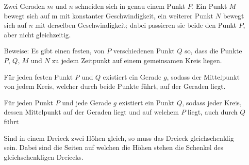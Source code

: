 \documentclass[10pt, a4paper]{amsart}
\begin{document}
\newpage
\begin{aufgabe}
  Zwei Geraden $m$ und $n$ schneiden sich in genau einem Punkt $P$. Ein Punkt
  $M$ bewegt sich auf m mit konstanter Geschwindigkeit, ein weiterer Punkt $N$
  bewegt sich auf $n$ mit derselben Geschwindigkeit; dabei passieren sie beide
  den Punkt $P$, aber nicht gleichzeitig.
 
  Beweise: Es gibt einen festen, von $P$ verschiedenen Punkt $Q$ so, dass die
  Punkte
  $P$, $Q$, $M$ und $N$ zu jedem Zeitpunkt auf einem gemeinsamen Kreis liegen.\\
\end{aufgabe}
\begin{lemma}\label{sec3:lemma1}
  Für jeden festen Punkt $P$ und $Q$ existiert ein Gerade $g$, sodass
  der Mittelpunkt von jedem Kreis, welcher durch beide Punkte führt, auf der
  Geraden liegt.
\end{lemma}
\begin{lemma}\label{sec3:lemma3}
  Für jeden Punkt $P$ und jede Gerade $g$ existiert ein Punkt $Q$, sodass jeder
  Kreis, dessen Mittelpunkt auf der Geraden liegt und auf welchem $P$ liegt,
  auch durch $Q$ führt
\end{lemma}
\begin{lemma}\label{sec3:lemma2}
  Sind in einem Dreieck zwei Höhen gleich, so muss das Dreieck gleichschenklig
  sein. Dabei sind die Seiten auf welchen die Höhen stehen die Schenkel des
  gleichschenkligen Dreiecks.
\end{lemma}
\end{document}
